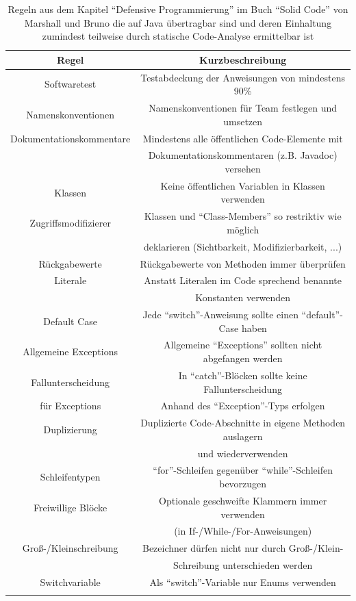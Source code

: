 \documentclass[da,ngerman]{stthesis}
\begin{document}
				\begin{center}
					\tabulinesep=1.5mm
					\begin{longtabu}{|c|c|}
						\hline
  						\textbf{Regel} & \textbf{Kurzbeschreibung}\\
  						\hline
  						Softwaretest & Testabdeckung der Anweisungen von mindestens 90\% \\ 
  						\hline   
  						Namenskonventionen & Namenskonventionen für Team festlegen und umsetzen \\
  						\hline
  						Dokumentationskommentare & Mindestens alle öffentlichen Code-Elemente mit \\ & Dokumentationskommentaren (z.B. Javadoc) versehen \\
  						\hline
  						Klassen & Keine öffentlichen Variablen in Klassen verwenden \\
  						\hline
  						Zugriffsmodifizierer & Klassen und "`Class-Members"' so restriktiv wie möglich \\ & deklarieren (Sichtbarkeit, Modifizierbarkeit, ...) \\
  						\hline
  						Rückgabewerte & Rückgabewerte von Methoden immer überprüfen \\
  						\hline
  						Literale & Anstatt Literalen im Code sprechend benannte \\ &  Konstanten verwenden \\
  						\hline
  						Default Case & Jede "`switch"'-Anweisung sollte einen "`default"'-Case haben \\
  						\hline
  						Allgemeine Exceptions & Allgemeine "`Exceptions"' sollten nicht abgefangen werden \\
  						\hline
  						Fallunterscheidung & In "`catch"'-Blöcken sollte keine Fallunterscheidung \\ für Exceptions & Anhand des "`Exception"'-Typs erfolgen \\
  						\hline
  						Duplizierung & Duplizierte Code-Abschnitte in eigene Methoden auslagern \\ & und wiederverwenden \\
  						\hline
  						Schleifentypen & "`for"'-Schleifen gegenüber "`while"'-Schleifen bevorzugen \\
  						\hline
  						Freiwillige Blöcke & Optionale geschweifte Klammern immer verwenden \\ & (in If-/While-/For-Anweisungen) \\
  						\hline
  						Groß-/Kleinschreibung & Bezeichner dürfen nicht nur durch Groß-/Klein- \\ & Schreibung unterschieden werden \\
  						\hline
  						Switchvariable & Als "`switch"'-Variable nur Enums verwenden \\
  						\hline
  						\caption{Regeln aus dem Kapitel "`Defensive Programmierung"' im Buch "`Solid Code"' von Marshall und Bruno die auf Java übertragbar sind und deren Einhaltung zumindest teilweise durch statische Code-Analyse ermittelbar ist \cite{SolidCode}}
						\label{solidcoderules}
  					\end{longtabu}   
  				\end{center}
\end{document}
